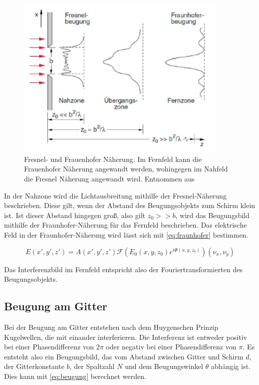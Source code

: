 \begin{figure}[h!]
	\centering
	\includegraphics[width=0.9\textwidth]{abstande.png}
	\caption{Fresnel- und Frauenhofer Näherung. Im Fernfeld kann die Frauenhofer Näherung angewandt werden, wohingegen im Nahfeld die Fresnel Näherung angewandt wird. Entnommen aus \autocite{anleitung-ws2014}}
	\label{Theoriebild}
\end{figure}

In der Nahzone wird die Lichtausbreitung mithilfe der Fresnel-Näherung beschrieben. Diese gilt, wenn der Abstand des Beugungsobjekts zum Schirm klein ist. Ist dieser Abstand hingegen groß, also gilt $z_0 >> b$, wird das Beugungsbild mithilfe der Fraunhofer-Näherung für das Fernfeld beschrieben. Das elektrische Feld in der Fraunhofer-Näherung wird lässt sich mit \cref{eq:fraunhofer} bestimmen.

\begin{equation}
E\left( x', y', z'\right) = A\left( x', y', z'\right) \mathcal{F}\left( E_0\left( x, y, z_0\right) e^{i\Phi\left( x, y, z_0\right) }\right) \left( \nu_x, \nu_y\right) 
\label{eq:fraunhofer}
\end{equation}

Das Interferenzbild im Fernfeld entspricht also der Fouriertransformierten des Beugungsobjekts.

\subsection{Beugung am Gitter}
Bei der Beugung am Gitter entstehen nach dem Huygenschen Prinzip Kugelwellen, die mit einander interferieren. Die Interferenz ist entweder positiv bei einer Phasendifferenz von $2\pi$ oder negativ bei einer Phasendifferenz von $\pi$. Es entsteht also ein Beugungsbild, das vom Abstand zwischen Gitter und Schirm $d$, der Gitterkonstante $b$, der Spaltzahl $N$ und dem Beugungswinkel $\theta$ abhängig ist. Dies kann mit \cref{eq:beugung} berechnet werden.

